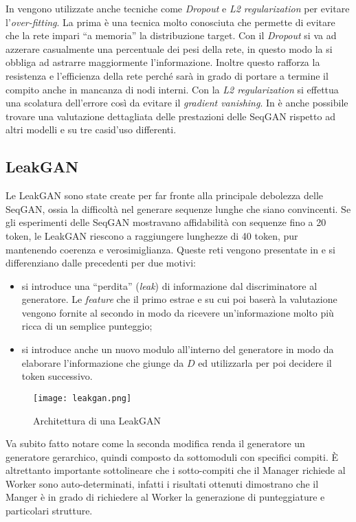 In \cite{SeqGAN} vengono utilizzate anche tecniche come \emph{Dropout} e \emph{L2 regularization} per evitare l'\emph{over-fitting}. 
La prima è una tecnica molto conosciuta che permette di evitare che la rete impari ``a memoria'' la distribuzione target.
Con il \emph{Dropout} si va ad azzerare casualmente una percentuale dei pesi della rete, in questo modo la si obbliga ad astrarre maggiormente l'informazione.
Inoltre questo rafforza la resistenza e l'efficienza della rete perché sarà in grado di portare a termine il compito anche in mancanza di nodi interni.
Con la \emph{L2 regularization} si effettua una scolatura dell'errore così da evitare il \emph{gradient vanishing}. %
In \cite{SeqGAN} è anche possibile trovare una valutazione dettagliata delle prestazioni delle SeqGAN rispetto ad altri modelli e su tre casi$ $d'uso differenti.


\subsection{LeakGAN}
Le LeakGAN sono state create per far fronte alla principale debolezza delle SeqGAN, ossia la difficoltà nel generare sequenze lunghe che siano convincenti.
Se gli esperimenti delle SeqGAN mostravano affidabilità con sequenze fino a 20 token, le LeakGAN riescono a raggiungere lunghezze di 40 token, pur mantenendo coerenza e verosimiglianza.
Queste reti vengono presentate in \cite{LeakGAN} e si differenziano dalle precedenti per due motivi:
\begin{itemize}
  \item si introduce una ``perdita'' (\emph{leak}) di informazione dal discriminatore al generatore.
    Le \emph{feature} che il primo estrae e su cui poi baserà la valutazione vengono fornite al secondo in modo da ricevere un'informazione molto più ricca di un semplice punteggio; 
  \item si introduce anche un nuovo modulo all'interno del generatore in modo da elaborare l'informazione che giunge da $D$ ed utilizzarla per poi decidere il token successivo.
\end{itemize}
\begin{figure}[ht]
  \centering
  \texttt{[image: leakgan.png]}
  \caption{Architettura di una LeakGAN \cite{LeakGAN}}
  \label{fig:leakgan}
\end{figure}
Va subito fatto notare come la seconda modifica renda il generatore un generatore gerarchico, quindi composto da sottomoduli con specifici compiti.
È altrettanto importante sottolineare che i sotto-compiti che il Manager richiede al Worker sono auto-determinati, infatti i risultati ottenuti dimostrano che il Manger è in grado di richiedere al Worker la generazione di punteggiature e particolari strutture.

